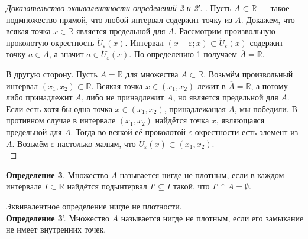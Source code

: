 \documentclass{report}
\begin{document}
\begin{proof}[Доказательство эквивалентности определений 2 и 2′]. Пусть $A \subset \mathbb{R}$ — такое подмножество прямой, что любой интервал содержит точку из $A$. Докажем, что всякая точка $x \in \mathbb{R}$ является предельной для $A$. Рассмотрим произвольную проколотую окрестность $\mathring{U}_{\varepsilon}(x)$. Интервал $(x-\varepsilon;x) \subset \mathring{U}_{\varepsilon}(x)$ содержит точку $a \in A$, а значит $a \in \mathring{U}_{\varepsilon}(x)$. По определению 1 получаем $\overline{A} = \mathbb{R}$. 

В другую сторону. Пусть $\overline{A} = \mathbb{R}$ для множества $A \subset \mathbb{R}$. Возьмём произвольный интервал $(x_1, x_2) \subset \mathbb{R}$. Всякая точка $x \in (x_1, x_2)$ лежит в $\overline{A} = \mathbb{R}$, а потому либо принадлежит $A$, либо не принадлежит $A$, но является предельной для $A$. Если есть хотя бы одна точка $x \in (x_1, x_2)$, принадлежащая $A$, мы победили. В противном случае в интервале $(x_1, x_2)$ найдётся точка $x$, являющаяся предельной для $A$. Тогда во всякой её проколотой $\varepsilon$-окрестности есть элемент из $A$. Возьмём $\varepsilon$ настолько малым, что $\mathring{U}_{\varepsilon}(x) \subset (x_1, x_2)$. \\
\end{proof}
\textbf{Определение 3}. Множество $A$ называется нигде не плотным, если в каждом интервале $I \subset \mathbb{R}$ найдётся подынтервал $I’ \subseteq I$ такой, что $I’ \cap A = \emptyset$. 

Эквивалентное определение нигде не плотности. \\

\textbf{Определение 3}'. Множество $A$ называется нигде не плотным, если его замыкание не имеет внутренних точек.\\ 
\end{document}
